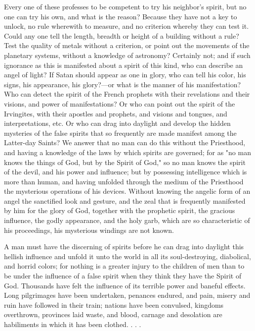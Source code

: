 Every one of these professes to be competent to try his neighbor's spirit, but no one can try
his own, and what is the reason? Because they have not a key to unlock, no rule wherewith to
measure, and no criterion whereby they can test it. Could any one tell the length, breadth or
height of a building without a rule? Test the quality of metals without a criterion, or point out
the movements of the planetary systems, without a knowledge of astronomy? Certainly not;
and if such ignorance as this is manifested about a spirit of this kind, who can describe an
angel of light? If Satan should appear as one in glory, who can tell his color, his signs, his
appearance, his glory?—or what is the manner of his manifestation? Who can detect the
spirit of the French prophets with their revelations and their visions, and power of
manifestations? Or who can point out the spirit of the Irvingites, with their apostles and
prophets, and visions and tongues, and interpretations, etc. Or who can drag into daylight and
develop the hidden mysteries of the false spirits that so frequently are made manifest among
the Latter-day Saints? We answer that no man can do this without the Priesthood, and having
a knowledge of the laws by which spirits are governed; for as "no man knows the things of
God, but by the Spirit of God," so no man knows the spirit of the devil, and his power and
influence; but by possessing intelligence which is more than human, and having unfolded
through the medium of the Priesthood the mysterious operations of his devices. Without
knowing the angelic form of an angel the sanctified look and gesture, and the zeal that is
frequently manifested by him for the glory of God, together with the prophetic spirit, the
gracious influence, the godly appearance, and the holy garb, which are so characteristic of his
proceedings, his mysterious windings are not known.

A man must have the discerning of spirits before he can drag into daylight this hellish
influence and unfold it unto the world in all its soul-destroying, diabolical, and horrid colors;
for nothing is a greater injury to the children of men than to be under the influence of a false
spirit when they think they have the Spirit of God. Thousands have felt the influence of its
terrible power and baneful effects. Long pilgrimages have been undertaken, penances
endured, and pain, misery and ruin have followed in their train; nations have been convulsed,
kingdoms overthrown, provinces laid waste, and blood, carnage and desolation are
habiliments in which it has been clothed. . . .

